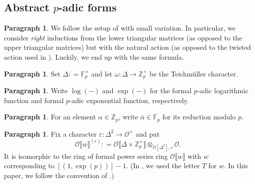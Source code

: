 \documentclass[12pt]{amsart}
\theoremstyle{definition}
\newtheorem{para}[subsection]{Paragraph}
\numberwithin{equation}{subsection}
\def\calO{\mathcal{O}}
\def\FF{\mathbb{F}}
\def\ZZ{\mathbb{Z}}
\begin{document}
\subsection{Abstract $p$-adic forms}
\label{S:abstract p-adic forms}
\begin{para}
\label{P:para_056}
We follow the setup of \cite[\S\,2.3]{liu-wan-xiao} with small variation. In particular, we consider \emph{right} inductions from the lower triangular matrices (as opposed to the upper triangular matrices) but with the natural action (as opposed to the twisted action used in \cite[\S~2.3]{liu-wan-xiao}). Luckily, we end up with the same formula.
\end{para}

\begin{para}
\label{P:para_057}
Set $\Delta : = \FF_p^\times$
and let $\omega: \Delta \to \ZZ_p^\times$ be the Teichm\"uller character. 
\end{para}

\begin{para}
\label{P:para_058}
Write $\log(-)$ and $\exp(-)$ for the formal $p$-adic logarithmic function and formal $p$-adic exponential function, respectively.
\end{para}

\begin{para}
\label{P:para_059}
For an element $\alpha \in \ZZ_p$, write $\bar \alpha \in \FF_p$ for its reduction modulo $p$.
\end{para}

\begin{para}
\label{P:para_060}
Fix a character $\varepsilon: \Delta^2 \to \calO^\times$ and put
\[
\calO\llbracket w \rrbracket^{(\varepsilon)}: = \calO\llbracket \Delta \times \ZZ_p^\times\rrbracket \otimes_{\calO[\Delta^2], \varepsilon} \calO. 
\]
It is isomorphic to the ring of formal power series ring $\calO\llbracket w \rrbracket$ with $w$ corresponding to $[(1, \exp(p))]-1$. (In \cite{liu-wan-xiao}, we used the letter $T$ for $w$. In this paper, we follow the convention of \cite{bergdall-pollack2, bergdall-pollack3}.)
\end{para}
\end{document}
